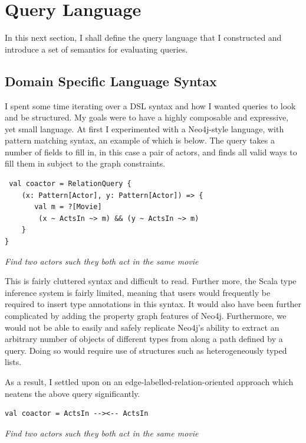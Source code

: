 \documentclass[12pt,a4paper,twoside,openright]{report}
\newcommand\note[1]{\textit{#1}}
\renewcommand{\baselinestretch}{1.1}    %
\begin{document}
\section{Query Language}

In this next section, I shall define the query language that I constructed and introduce a set of semantics for evaluating queries.

\subsection{Domain Specific Language Syntax}
I spent some time iterating over a DSL syntax and how I wanted queries to look and be structured. My goals were to have a highly composable and expressive, yet small language. At first I experimented with a Neo4j-style language, with pattern matching syntax, an example of which is below. The query takes a number of fields to fill in, in this case a pair of actors, and finds all valid ways to fill them in subject to the graph constraints.
\renewcommand{\baselinestretch}{0.8}
\begin{framed}
\begin{verbatim}
 val coactor = RelationQuery {
    (x: Pattern[Actor], y: Pattern[Actor]) => {
       val m = ?[Movie]
        (x ~ ActsIn ~> m) && (y ~ ActsIn ~> m)
    }
}
\end{verbatim}
\note{Find two actors such they both act in the same movie}
\end{framed}
\renewcommand{\baselinestretch}{1.1}
This is fairly cluttered syntax and difficult to read. Further more, the Scala type inference system is fairly limited, meaning that users would frequently be required to insert type annotations in this syntax. It would also have been further complicated by adding the property graph features of Neo4j. Furthermore, we would not be able to easily and safely replicate Neo4j's ability to extract an arbitrary number of objects of different types from along a path defined by a query. Doing so would require use of structures such as heterogeneously typed lists.

As a result, I settled upon on an edge-labelled-relation-oriented approach which neatens the above query significantly.

\renewcommand{\baselinestretch}{0.8}
\begin{framed}
\begin{verbatim}
val coactor = ActsIn --><-- ActsIn
\end{verbatim}
\note{Find two actors such they both act in the same movie}
\end{framed}
\renewcommand{\baselinestretch}{1.1}
\end{document}
